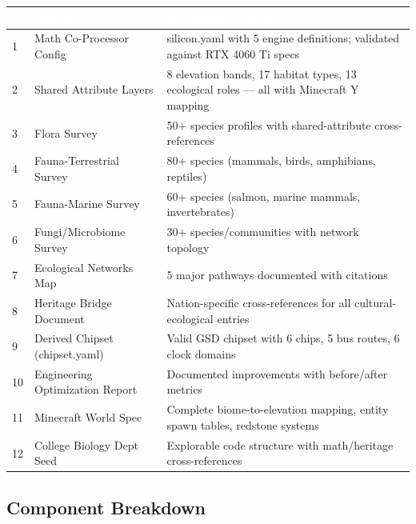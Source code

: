\documentclass[11pt,letterpaper]{article}
\newcommand{\tableheader}[1]{\textbf{\sffamily\textcolor{white}{#1}}}
\begin{document}
\begin{center}
\begin{tabularx}{\textwidth}{C{0.5cm}L{3.5cm}X}
\toprule
{}
\tableheader{\#} & \tableheader{Deliverable} & \tableheader{Acceptance Criteria} \\
 & Math Co-Processor Config & silicon.yaml with 5 engine definitions; validated against RTX 4060 Ti specs \\
2 & Shared Attribute Layers & 8 elevation bands, 17 habitat types, 13 ecological roles --- all with Minecraft Y mapping \\
3 & Flora Survey & 50+ species profiles with shared-attribute cross-references \\
4 & Fauna-Terrestrial Survey & 80+ species (mammals, birds, amphibians, reptiles) \\
5 & Fauna-Marine Survey & 60+ species (salmon, marine mammals, invertebrates) \\
6 & Fungi/Microbiome Survey & 30+ species/communities with network topology \\
7 & Ecological Networks Map & 5 major pathways documented with citations \\
8 & Heritage Bridge Document & Nation-specific cross-references for all cultural-ecological entries \\
9 & Derived Chipset (chipset.yaml) & Valid GSD chipset with 6 chips, 5 bus routes, 6 clock domains \\
10 & Engineering Optimization Report & Documented improvements with before/after metrics \\
11 & Minecraft World Spec & Complete biome-to-elevation mapping, entity spawn tables, redstone systems \\
12 & College Biology Dept Seed & Explorable code structure with math/heritage cross-references \\
\bottomrule
\end{tabularx}
\end{center}

\subsection{Component Breakdown}
\end{document}
